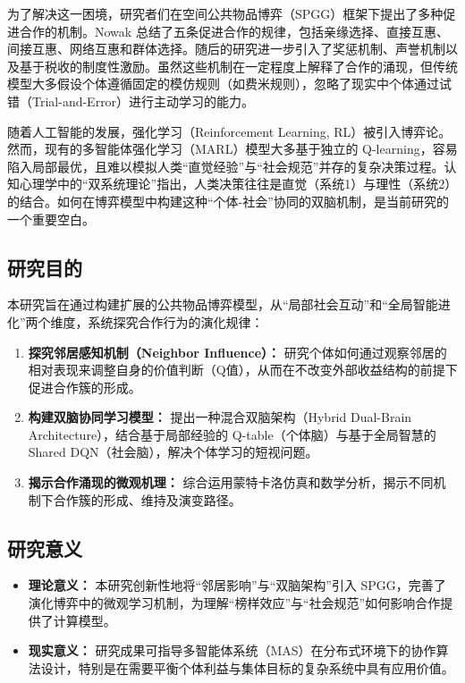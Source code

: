 \documentclass[UTF8,a4paper,12pt]{ctexart}
\begin{document}
为了解决这一困境，研究者们在空间公共物品博弈（SPGG）框架下提出了多种促进合作的机制。Nowak 总结了五条促进合作的规律，包括亲缘选择、直接互惠、间接互惠、网络互惠和群体选择\cite{nowak2006}。随后的研究进一步引入了奖惩机制\cite{sigmund2001}、声誉机制\cite{milinski2002}以及基于税收的制度性激励\cite{wang2021tax, li2022}。虽然这些机制在一定程度上解释了合作的涌现，但传统模型大多假设个体遵循固定的模仿规则（如费米规则），忽略了现实中个体通过试错（Trial-and-Error）进行主动学习的能力。

随着人工智能的发展，强化学习（Reinforcement Learning, RL）被引入博弈论\cite{sutton2018}。然而，现有的多智能体强化学习（MARL）模型大多基于独立的 Q-learning，容易陷入局部最优，且难以模拟人类“直觉经验”与“社会规范”并存的复杂决策过程。认知心理学中的“双系统理论”指出，人类决策往往是直觉（系统1）与理性（系统2）的结合\cite{kahneman2011}。如何在博弈模型中构建这种“个体-社会”协同的双脑机制，是当前研究的一个重要空白。

\subsection{研究目的}
本研究旨在通过构建扩展的公共物品博弈模型，从“局部社会互动”和“全局智能进化”两个维度，系统探究合作行为的演化规律：
\begin{enumerate}
    \item \textbf{探究邻居感知机制（Neighbor Influence）：} 研究个体如何通过观察邻居的相对表现来调整自身的价值判断（Q值），从而在不改变外部收益结构的前提下促进合作簇的形成。
    \item \textbf{构建双脑协同学习模型：} 提出一种混合双脑架构（Hybrid Dual-Brain Architecture），结合基于局部经验的 Q-table（个体脑）与基于全局智慧的 Shared DQN（社会脑），解决个体学习的短视问题。
    \item \textbf{揭示合作涌现的微观机理：} 综合运用蒙特卡洛仿真和数学分析，揭示不同机制下合作簇的形成、维持及演变路径。
\end{enumerate}

\subsection{研究意义}
\begin{itemize}
    \item \textbf{理论意义：} 本研究创新性地将“邻居影响”与“双脑架构”引入 SPGG，完善了演化博弈中的微观学习机制，为理解“榜样效应”与“社会规范”如何影响合作提供了计算模型。
    \item \textbf{现实意义：} 研究成果可指导多智能体系统（MAS）在分布式环境下的协作算法设计，特别是在需要平衡个体利益与集体目标的复杂系统中具有应用价值。
\end{itemize}
\end{document}
